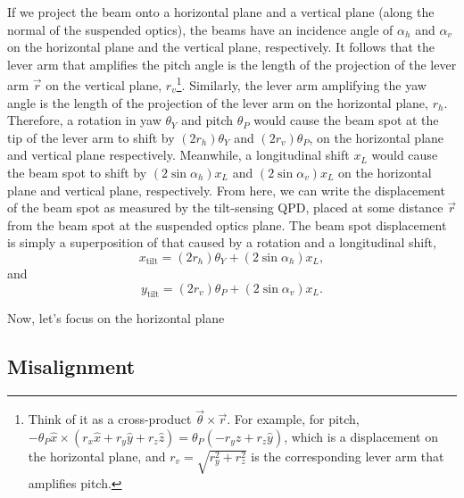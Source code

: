 If we project the beam onto a horizontal plane and a vertical plane (along the normal of the suspended optics), the beams have an incidence angle of $\alpha_h$ and $\alpha_v$ on the horizontal plane and the vertical plane, respectively.
It follows that the lever arm that amplifies the pitch angle is the length of the projection of the lever arm $\vec{r}$ on the vertical plane, $r_v$\footnote{Think of it as a cross-product $\vec{\theta}\times\vec{r}$. For example, for pitch, $-\theta_P\hat{x}\times\left(r_x\hat{x}+r_y\hat{y}+r_z\hat{z}\right) = \theta_P\left(-r_y\hat{z}+r_z\hat{y}\right)$, which is a displacement on the horizontal plane, and $r_v=\sqrt{r_y^2+r_z^2}$ is the corresponding lever arm that amplifies pitch.}.
Similarly, the lever arm amplifying the yaw angle is the length of the projection of the lever arm on the horizontal plane, $r_h$.
Therefore, a rotation in yaw $\theta_Y$ and pitch $\theta_P$ would cause the beam spot at the tip of the lever arm to shift by $\left(2r_h\right)\theta_Y$ and $\left(2r_v\right)\theta_P$, on the horizontal plane and vertical plane respectively.
Meanwhile, a longitudinal shift $x_L$ would cause the beam spot to shift by $\left(2\sin\alpha_h\right)x_L$ and $\left(2\sin\alpha_v\right)x_L$ on the horizontal plane and vertical plane, respectively.
From here, we can write the displacement of the beam spot as measured by the tilt-sensing QPD, placed at some distance $\vec{r}$ from the beam spot at the suspended optics plane.
The beam spot displacement is simply a superposition of that caused by a rotation and a longitudinal shift,
\begin{equation}
	x_\mathrm{tilt} = \left(2r_h\right)\theta_Y + \left(2\sin\alpha_h\right)x_L,
\end{equation}
and
\begin{equation}
	y_\mathrm{tilt} = \left(2r_v\right)\theta_P + \left(2\sin\alpha_v\right)x_L.
\end{equation}

Now, let's focus on the horizontal plane 



\subsection{Misalignment}

